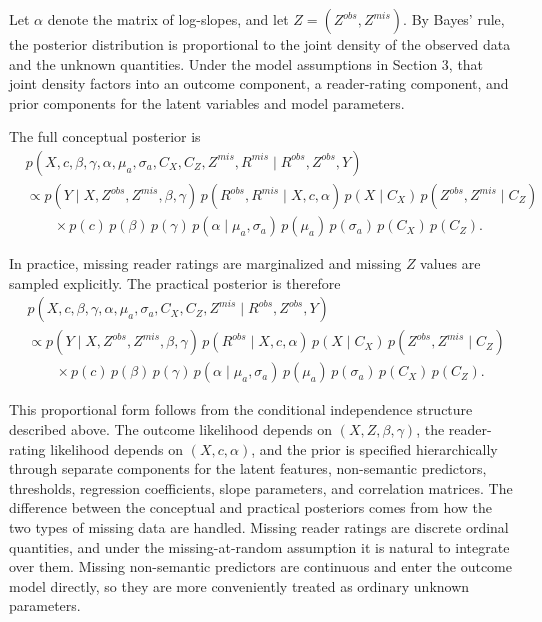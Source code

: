 \documentclass[twoside,11pt]{article}
\begin{document}
Let $\alpha$ denote the matrix of log-slopes, and let $Z=(Z^{obs},Z^{mis})$. By Bayes' rule, the posterior distribution is proportional to the joint density of the observed data and the unknown quantities. Under the model assumptions in Section 3, that joint density factors into an outcome component, a reader-rating component, and prior components for the latent variables and model parameters.

The full conceptual posterior is
\[
\begin{aligned}
&p(X,c,\beta,\gamma,\alpha,\mu_a,\sigma_a,C_X,C_Z,Z^{mis},R^{mis}\mid R^{obs},Z^{obs},Y) \\
&\propto
p(Y\mid X,Z^{obs},Z^{mis},\beta,\gamma)\,
p(R^{obs},R^{mis}\mid X,c,\alpha)\,
p(X\mid C_X)\,
p(Z^{obs},Z^{mis}\mid C_Z) \\
&\qquad \times
p(c)\,
p(\beta)\,
p(\gamma)\,
p(\alpha\mid \mu_a,\sigma_a)\,
p(\mu_a)\,
p(\sigma_a)\,
p(C_X)\,
p(C_Z).
\end{aligned}
\]

In practice, missing reader ratings are marginalized and missing $Z$ values are sampled explicitly. The practical posterior is therefore
\[
\begin{aligned}
&p(X,c,\beta,\gamma,\alpha,\mu_a,\sigma_a,C_X,C_Z,Z^{mis}\mid R^{obs},Z^{obs},Y) \\
&\propto
p(Y\mid X,Z^{obs},Z^{mis},\beta,\gamma)\,
p(R^{obs}\mid X,c,\alpha)\,
p(X\mid C_X)\,
p(Z^{obs},Z^{mis}\mid C_Z) \\
&\qquad \times
p(c)\,
p(\beta)\,
p(\gamma)\,
p(\alpha\mid \mu_a,\sigma_a)\,
p(\mu_a)\,
p(\sigma_a)\,
p(C_X)\,
p(C_Z).
\end{aligned}
\]

This proportional form follows from the conditional independence structure described above. The outcome likelihood depends on $(X,Z,\beta,\gamma)$, the reader-rating likelihood depends on $(X,c,\alpha)$, and the prior is specified hierarchically through separate components for the latent features, non-semantic predictors, thresholds, regression coefficients, slope parameters, and correlation matrices. The difference between the conceptual and practical posteriors comes from how the two types of missing data are handled. Missing reader ratings are discrete ordinal quantities, and under the missing-at-random assumption it is natural to integrate over them. Missing non-semantic predictors are continuous and enter the outcome model directly, so they are more conveniently treated as ordinary unknown parameters.
\end{document}
